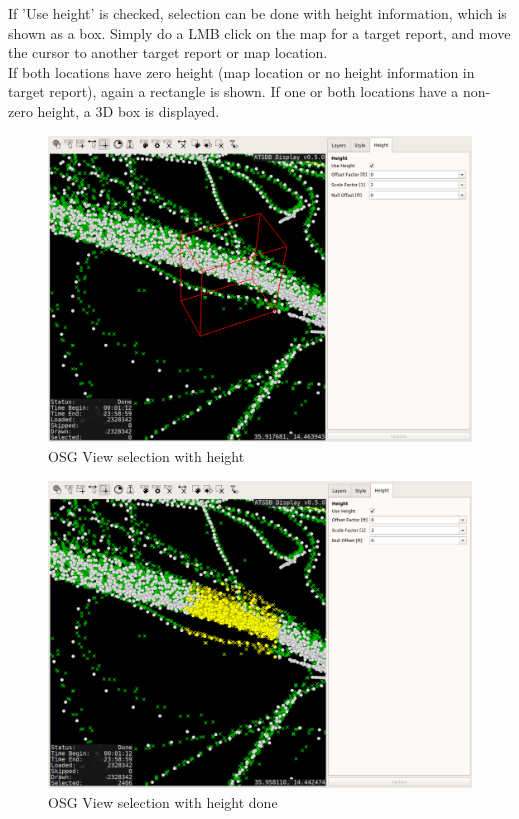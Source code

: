 If 'Use height' is checked, selection can be done with height information, which is shown as a box. Simply do a LMB click on the map for a target report, and move the cursor to another target report or map location.  \\

If both locations have zero height (map location or no height information in target report), again a rectangle is shown. If one or both locations have a non-zero height, a 3D box is displayed.

\begin{figure}[H]
    \hspace*{-2.5cm}
    \includegraphics[width=19cm,frame]{figures/osgview_select3d.png}
  \caption{OSG View selection with height}
\end{figure}


\begin{figure}[H]
    \hspace*{-2.5cm}
    \includegraphics[width=19cm,frame]{figures/osgview_select3d_2.png}
  \caption{OSG View selection with height done}
\end{figure}


